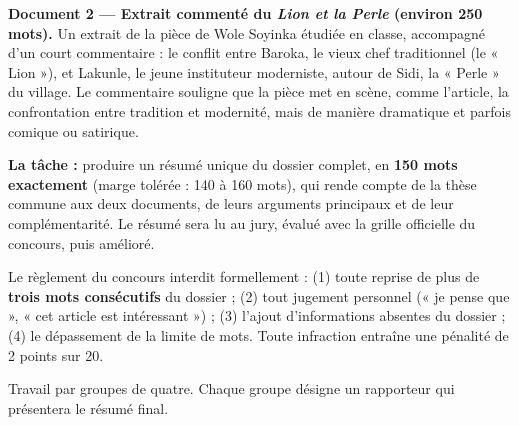 \documentclass[11pt]{article}
\newcounter{popsec}
\newcounter{popsub}
\newcommand{\courssub}[1]{%
  \stepcounter{popsub}%
  \par\vspace{9pt}\noindent{\popxbold\fontsize{11.5}{13}\selectfont\color{popink}{\color{poporange}\thepopsec.\thepopsub}\hspace{6pt}#1}\par\nopagebreak\vspace{4pt}
}
\begin{document}
\textbf{Document 2 — Extrait commenté du \emph{Lion et la Perle} (environ 250 mots).} Un extrait de la pièce de Wole Soyinka étudiée en classe, accompagné d'un court commentaire : le conflit entre Baroka, le vieux chef traditionnel (le « Lion »), et Lakunle, le jeune instituteur moderniste, autour de Sidi, la « Perle » du village. Le commentaire souligne que la pièce met en scène, comme l'article, la confrontation entre tradition et modernité, mais de manière dramatique et parfois comique ou satirique.

\textbf{La tâche :} produire un résumé unique du dossier complet, en \textbf{150 mots exactement} (marge tolérée : 140 à 160 mots), qui rende compte de la thèse commune aux deux documents, de leurs arguments principaux et de leur complémentarité. Le résumé sera lu au jury, évalué avec la grille officielle du concours, puis amélioré.

\begin{attention}
Le règlement du concours interdit formellement : (1) toute reprise de plus de \textbf{trois mots consécutifs} du dossier ; (2) tout jugement personnel (« je pense que », « cet article est intéressant ») ; (3) l'ajout d'informations absentes du dossier ; (4) le dépassement de la limite de mots. Toute infraction entraîne une pénalité de 2 points sur 20.
\end{attention}

\courssub{Consignes}

Travail par groupes de quatre. Chaque groupe désigne un rapporteur qui présentera le résumé final.
\end{document}
